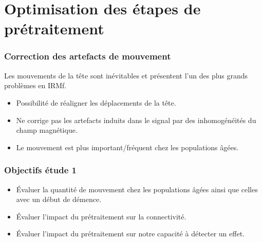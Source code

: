 \documentclass{beamer}
\begin{document}
\section{Optimisation des étapes de prétraitement} %

\frame{\sectionpage}

\begin{frame}
\frametitle{Correction des artefacts de mouvement}
Les mouvements de la tête sont inévitables et présentent l’un des plus grands problèmes en IRMf.
\hfill\break
\begin{itemize}
\item Possibilité de réaligner les déplacements de la tête.
\item Ne corrige pas les artefacts induits dans le signal par des inhomogénéités du champ magnétique.
\item Le mouvement est plus important/fréquent chez les populations âgées. 
\end{itemize}
\end{frame}


\begin{frame}
\frametitle{Objectifs étude 1}
\begin{itemize}
\item Évaluer la quantité de mouvement chez les populations âgées ainsi que celles avec un début de démence.
\item Évaluer l’impact du prétraitement sur la connectivité.
\item Évaluer l’impact du prétraitement sur notre capacité à détecter un effet.
\end{itemize}
\end{frame}
\end{document}
